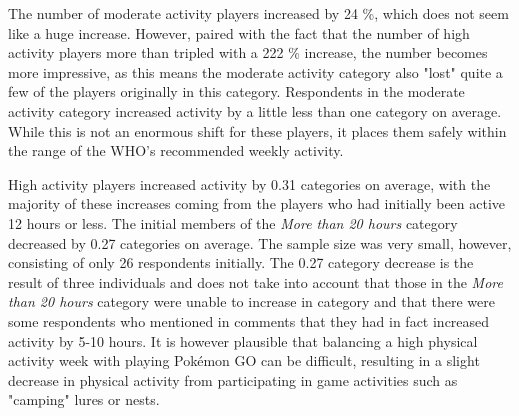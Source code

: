 The number of moderate activity players increased by 24 \%, which does not seem like a huge increase. However, paired with the fact that the number of high activity players more than tripled with a 222 \% increase, the number becomes more impressive, as this means the moderate activity category also "lost" quite a few of the players originally in this category. Respondents in the moderate activity category increased activity by a little less than one category on average. While this is not an enormous shift for these players, it places them safely within the range of the WHO's recommended weekly activity.

High activity players increased activity by 0.31 categories on average, with the majority of these increases coming from the players who had initially been active 12 hours or less. The initial members of the \emph{More than 20 hours} category decreased by 0.27 categories on average. The sample size was very small, however, consisting of only 26 respondents initially. The 0.27 category decrease is the result of three individuals and does not take into account that those in the \emph{More than 20 hours} category were unable to increase in category and that there were some respondents who mentioned in comments that they had in fact increased activity by 5-10 hours. It is however plausible that balancing a high physical activity week with playing Pokémon GO can be difficult, resulting in a slight decrease in physical activity from participating in game activities such as "camping" lures or nests. 








